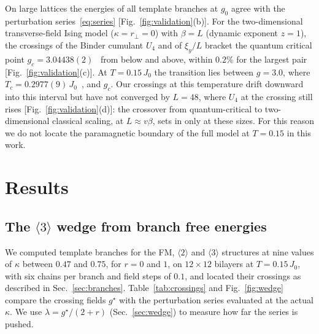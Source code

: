 \documentclass[
 aps,prb,
 twocolumn,
 superscriptaddress,
 longbibliography,
 nofootinbib,
 floatfix
]{revtex4-2}
\newcommand{\rp}{r_\perp}
\begin{document}
On large lattices the energies of all template branches at $g_0$ agree with the perturbation
series~\eqref{eq:series} [Fig.~\ref{fig:validation}(b)]. For the two-dimensional transverse-field Ising model
($\kappa=\rp=0$) with $\beta=L$ (dynamic exponent $z=1$), the crossings of the Binder cumulant $U_4$ and of $\xi_y/L$
bracket the quantum critical point $g_c=3.04438(2)$~\cite{blote2002cluster} from below and above, within $0.2\%$ for the
largest pair [Fig.~\ref{fig:validation}(c)]. At $T=0.15\,J_0$ the transition lies between $g=3.0$, where
$T_c=0.2977(9)\,J_0$~\cite{hesselmann2016thermal}, and $g_c$. Our crossings at this temperature drift downward into this
interval but have not converged by $L=48$, where $U_4$ at the crossing still rises [Fig.~\ref{fig:validation}(d)]: the
crossover from quantum-critical to two-dimensional classical scaling, at $L\approx v\beta$, sets in only at these sizes.
For this reason we do not locate the paramagnetic boundary of the full model at $T=0.15$ in this work.

\section{Results}
\label{sec:results}

\subsection{The $\langle3\rangle$ wedge from branch free energies}
\label{sec:res_branches}

We computed template branches for the FM, $\langle2\rangle$ and $\langle3\rangle$ structures at nine values of $\kappa$
between $0.47$ and $0.75$, for $r=0$ and $1$, on $12\times12$ bilayers at $T=0.15\,J_0$, with six chains per branch and
field steps of $0.1$, and located their crossings as described in Sec.~\ref{sec:branches}. Table~\ref{tab:crossings} and
Fig.~\ref{fig:wedge} compare the crossing fields $g^\star$ with the perturbation series evaluated at the actual $\kappa$.
We use $\lambda=g^\star/(2+r)$ (Sec.~\ref{sec:wedge}) to measure how far the series is pushed.
\end{document}
